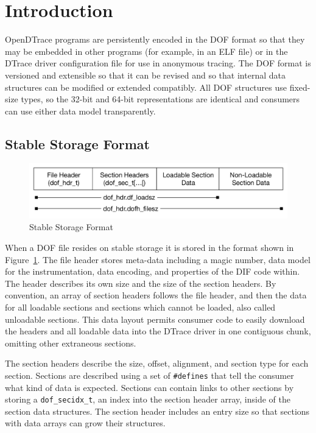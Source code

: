 \section{Introduction}
\label{sec:dof-intro}

OpenDTrace programs are persistently encoded in the DOF format so that
they may be embedded in other programs (for example, in an ELF file)
or in the DTrace driver configuration file for use in anonymous
tracing.  The DOF format is versioned and extensible so that it can be
revised and so that internal data structures can be modified or
extended compatibly.  All DOF structures use fixed-size types, so the
32-bit and 64-bit representations are identical and consumers can use
either data model transparently.

\subsection{Stable Storage Format}
\label{sec:dof-stable-storage}

\begin{figure}[h]
  \centering
  \includegraphics[width=.8\textwidth]{dof-stable-format}
  \caption{Stable Storage Format}
  \label{fig:dof-stable-storage-format}
\end{figure}

When a DOF file resides on stable storage it is stored in the format
shown in Figure~\ref{fig:dof-stable-storage-format}. The file header
stores meta-data including a magic number, data model for the
instrumentation, data encoding, and properties of the DIF code within.
The header describes its own size and the size of the section headers.
By convention, an array of section headers follows the file header,
and then the data for all loadable sections and sections which cannot
be loaded, also called unloadable sections.  This data layout permits
consumer code to easily download the headers and all loadable data
into the DTrace driver in one contiguous chunk, omitting other
extraneous sections.

The section headers describe the size, offset, alignment, and section
type for each section.  Sections are described using a set of \verb|#defines|
that tell the consumer what kind of data is expected.  Sections can
contain links to other sections by storing a \verb|dof_secidx_t|, an index
into the section header array, inside of the section data structures.
The section header includes an entry size so that sections with data
arrays can grow their structures.

